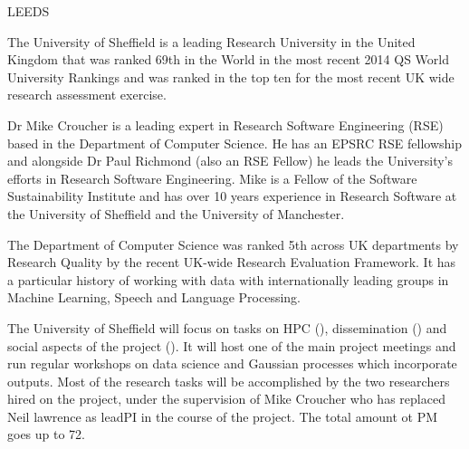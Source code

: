 \begin{sitedescription}{LEEDS}



The University of Sheffield is a leading Research University in the
United Kingdom that was ranked 69th in the World in the most recent
2014 QS World University Rankings and was ranked in the top ten for
the most recent UK wide research assessment exercise.  

Dr Mike Croucher is a leading expert in Research Software Engineering (RSE) 
based in the Department of Computer Science. He has an EPSRC RSE fellowship and 
alongside Dr Paul Richmond (also an RSE Fellow) he leads the University's 
efforts in Research Software Engineering. Mike is a Fellow of the Software
Sustainability Institute and has over 10 years experience in Research Software
at the University of Sheffield and the University of Manchester.


The Department of Computer Science was ranked 5th across UK
departments by Research Quality by the recent UK-wide Research
Evaluation Framework. It has a particular history of working with data
with internationally leading groups in Machine Learning, Speech and
Language Processing.

The University of Sheffield will focus on tasks on HPC (),
dissemination () and social aspects of the project
(). It will host one of the main project meetings
and run regular workshops on data science and Gaussian processes which incorporate
\TheProject outputs. Most of the research tasks will be accomplished by the two researchers hired on the project, under the supervision of Mike Croucher who has replaced Neil lawrence as leadPI in the course of the project. The total amount ot PM goes up to 72.


\end{sitedescription}
